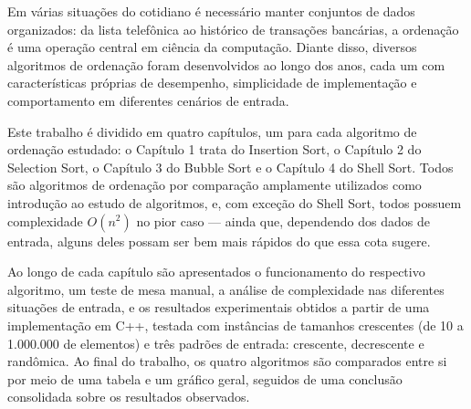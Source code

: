 \qquad Em várias situações do cotidiano é necessário manter conjuntos de
dados organizados: da lista telefônica ao histórico de transações
bancárias, a ordenação é uma operação central em ciência da
computação. Diante disso, diversos algoritmos de ordenação foram
desenvolvidos ao longo dos anos, cada um com características
próprias de desempenho, simplicidade de implementação e
comportamento em diferentes cenários de entrada.

\qquad Este trabalho é dividido em quatro capítulos, um para cada
algoritmo de ordenação estudado: o Capítulo 1 trata do Insertion
Sort, o Capítulo 2 do Selection Sort, o Capítulo 3 do Bubble Sort e
o Capítulo 4 do Shell Sort. Todos são algoritmos de ordenação por
comparação amplamente utilizados como introdução ao estudo de
algoritmos, e, com exceção do Shell Sort, todos possuem complexidade
$O(n^2)$ no pior caso — ainda que, dependendo dos dados de entrada,
alguns deles possam ser bem mais rápidos do que essa cota sugere.

\qquad Ao longo de cada capítulo são apresentados o funcionamento do
respectivo algoritmo, um teste de mesa manual, a análise de
complexidade nas diferentes situações de entrada, e os resultados
experimentais obtidos a partir de uma implementação em C++, testada
com instâncias de tamanhos crescentes (de 10 a 1.000.000 de
elementos) e três padrões de entrada: crescente, decrescente e
randômica. Ao final do trabalho, os quatro algoritmos são comparados
entre si por meio de uma tabela e um gráfico geral, seguidos de uma
conclusão consolidada sobre os resultados observados.
